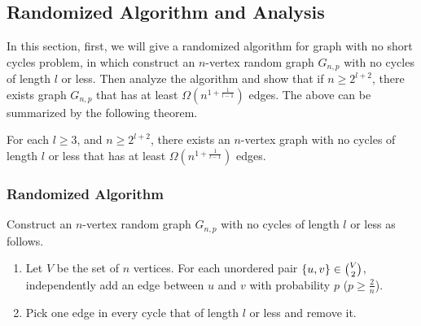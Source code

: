 \subsection {Randomized Algorithm and Analysis}
In this section, first, we will give a randomized algorithm for graph with no short cycles problem, in which construct an $n$-vertex random graph $G_{n,p}$ with no cycles of length $l$ or less. Then analyze the algorithm and show that if $n\ge 2^{l+2}$, there exists graph $G_{n,p}$ that has at least $\Omega (n^{1+\frac{1}{l-1}})$ edges. The above can be summarized by the following theorem.
\begin{theorem}
For each $l\ge 3$, and $n\ge 2^{l+2}$, there exists an $n$-vertex graph with no cycles of length $l$ or less that has at least $\Omega (n^{1+\frac{1}{l-1}})$ edges.
\end{theorem}
\subsubsection{Randomized Algorithm}
Construct an $n$-vertex random graph $G_{n,p}$ with no cycles of length $l$ or less as follows. 
\begin{enumerate}
    \item Let $V$ be the set of $n$ vertices. For each unordered pair $\{u,v\}\in \tbinom{V}{2}$, independently add an edge between $u$ and $v$ with probability $p$ ($p\ge \frac{2}{n}$).
    \item Pick one edge in every cycle that of length $l$ or less and remove it.
\end{enumerate}

